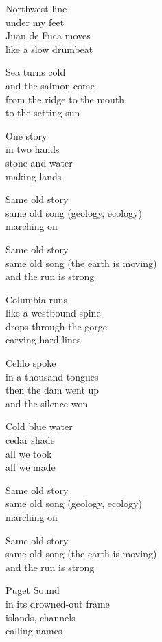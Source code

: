 \begin{lyrics}
Northwest line\\
under my feet\\
Juan de Fuca moves\\
like a slow drumbeat

Sea turns cold\\
and the salmon come\\
from the ridge to the mouth\\
to the setting sun

One story\\
in two hands\\
stone and water\\
making lands

Same old story\\
same old song
(geology, ecology)\\
marching on

Same old story\\
same old song
(the earth is moving)\\
and the run is strong

Columbia runs\\
like a westbound spine\\
drops through the gorge\\
carving hard lines

Celilo spoke\\
in a thousand tongues\\
then the dam went up\\
and the silence won

Cold blue water\\
cedar shade\\
all we took\\
all we made

Same old story\\
same old song
(geology, ecology)\\
marching on

Same old story\\
same old song
(the earth is moving)\\
and the run is strong

Puget Sound\\
in its drowned-out frame\\
islands, channels\\
calling names


\end{lyrics}
